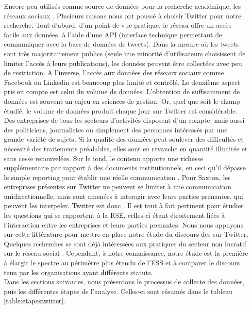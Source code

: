     Encore peu utilisés comme source de données pour la recherche académique, les réseaux sociaux  \parencite[][p. 161]{saxton2016csr}. Plusieurs raisons nous ont poussé à choisir Twitter pour notre recherche. Tout d'abord, d'un point de vue pratique, le réseau offre un accès facile aux données,  à l'aide d'une API (interface technique permettant de communiquer avec la base de données de tweets). Dans la mesure où les tweets sont très majoritairement publics (seule une minorité d'utilisateurs choisissent de limiter l'accès à leurs publications), les données peuvent être collectées avec peu de restriction. A l'inverse, l'accès aux données des réseaux sociaux comme Facebook ou Linkedin est beaucoup plus limité et contrôlé. Le deuxième aspect pris en compte est celui du volume de données. L'obtention de suffisamment de données est souvent un enjeu en sciences de gestion. Or, quel que soit le champ étudié, le volume de données produit chaque jour sur Twitter est considérable. Des entreprises de tous les secteurs d'activités disposent d'un compte, mais aussi des politiciens, journalistes ou simplement des personnes intéressés par une grande variété de sujets. Si la qualité des données peut soulever des difficultés et nécessité des traitements préalables, elles sont en revanche en quantité illimitée et sans cesse renouvelées. Sur le fond, le contenu apporte une richesse supplémentaire par rapport à des documents institutionnels, en ceci qu'il dépasse le simple reporting pour établir une réelle communication \parencite{saxton2016csr}. Pour Saxton, les entreprises présentes sur Twitter ne peuvent se limiter à une communication unidirectionnelle, mais sont amenées à interagir avec leurs parties prenantes, qui peuvent les interpeler. Twitter est donc  \parencite[][p. 164]{saxton2016csr}. Il est tout à fait pertinent pour étudier les questions qui se rapportent à la RSE, celles-ci étant étroitement liées à l'interaction entre les entreprises et leurs parties prenantes. Nous nous appuyons sur cette littérature pour mettre en place notre étude du discours des \eess sur Twitter. Quelques recherches se sont déjà intéressées aux pratiques du secteur non lucratif sur le réseau social \parencite{waters2011tweet, guo2014tweeting, guo2017speaking}. Cependant, à notre connaissance, notre étude est la première à élargir le spectre au périmètre plus étendu de l'ESS et à comparer le discours tenu par les organisations ayant différents statuts. \\


    Dans les sections suivantes, nous présentons le processus de collecte des données, puis les différentes étapes de l'analyse. Celles-ci sont résumés dans le tableau \ref{table:etapestwitter}.
